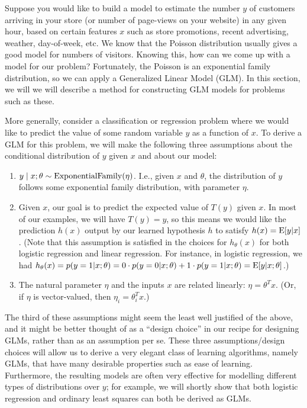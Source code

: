 \documentclass{article}
\begin{document}
Suppose you would like to build a model to estimate the number $y$ of customers
arriving in your store (or number of page-views on your website) in any given
hour, based on certain features $x$ such as store promotions, recent
advertising, weather, day-of-week, etc.  We know that the Poisson distribution
usually gives a good model for numbers of visitors.
Knowing this, how can we come up with a model for our problem?  Fortunately,
the Poisson is an exponential family distribution, so we can apply a Generalized
Linear Model (GLM).
In this section, we will we will describe a method for
constructing GLM models for problems such as these.

More generally, consider a classification or regression problem where we would
like to predict the value of some random variable $y$ as a function of $x$.
To derive a GLM for this problem, we will make the following three
assumptions about the conditional distribution of $y$ given $x$ and
about our model:
\begin{enumerate}
\item $y\mid x; \theta \sim {\rm ExponentialFamily}(\eta)$.  I.e.,
given $x$ and $\theta$, the distribution of $y$ follows some
exponential family distribution, with parameter $\eta$.
\item Given $x$, our goal is to predict the expected value of $T(y)$ given $x$.
In most of our examples, we will have $T(y)=y$, so this means we would like
the prediction $h(x)$ output by our learned hypothesis $h$ to
satisfy $h(x) = {\rm E}[y|x]$.
(Note that this assumption is satisfied in the choices for $h_\theta(x)$ for
both logistic regression and linear regression.
For instance, in logistic regression,
we had $h_\theta(x) = p(y=1 | x;\theta) =
0 \cdot p(y=0 | x;\theta)
+ 1 \cdot p(y=1 | x;\theta) =
{\rm E}[y|x;\theta]$.)
\item The natural parameter $\eta$ and the inputs $x$ are related
linearly: $\eta = \theta^Tx$.
(Or, if $\eta$ is vector-valued, then $\eta_i = \theta_i^Tx$.)
\end{enumerate}

The third of these assumptions might seem the least well justified of the
above, and it might be better thought of as a ``design choice'' in our
recipe for designing GLMs, rather than as an assumption per se.  These
three assumptions/design choices will allow us to derive a
very elegant class
of learning algorithms, namely GLMs, that have many desirable
properties such as ease of learning.
Furthermore, the resulting
models are often very effective for modelling different types of
distributions over $y$; for example, we will shortly show that
both logistic regression and ordinary least squares
can both be
derived as GLMs.
\end{document}
